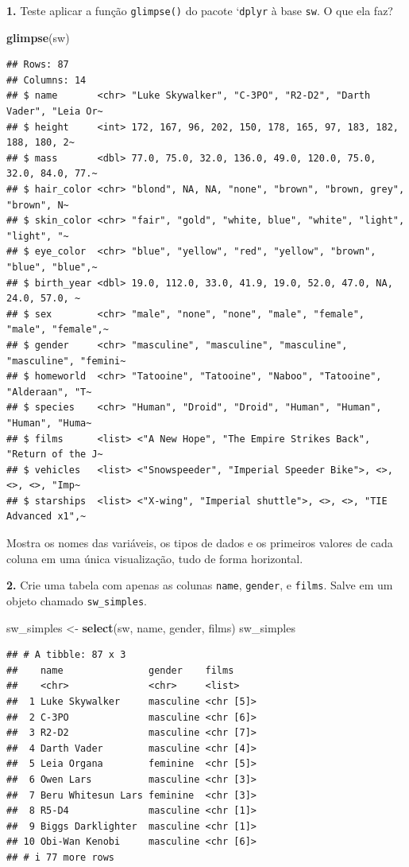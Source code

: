 \documentclass[
]{book}
\newenvironment{Shaded}{\begin{snugshade}}{\end{snugshade}}
\newcommand{\FunctionTok}[1]{\textcolor[rgb]{0.13,0.29,0.53}{\textbf{#1}}}
\newcommand{\NormalTok}[1]{#1}
\newcommand{\OtherTok}[1]{\textcolor[rgb]{0.56,0.35,0.01}{#1}}
\begin{document}
\textbf{1.} Teste aplicar a função \texttt{glimpse()} do pacote `\texttt{dplyr} à base
\texttt{sw}. O que ela faz?

\begin{Shaded}
\begin{Highlighting}[]
\FunctionTok{glimpse}\NormalTok{(sw)}
\end{Highlighting}
\end{Shaded}

\begin{verbatim}
## Rows: 87
## Columns: 14
## $ name       <chr> "Luke Skywalker", "C-3PO", "R2-D2", "Darth Vader", "Leia Or~
## $ height     <int> 172, 167, 96, 202, 150, 178, 165, 97, 183, 182, 188, 180, 2~
## $ mass       <dbl> 77.0, 75.0, 32.0, 136.0, 49.0, 120.0, 75.0, 32.0, 84.0, 77.~
## $ hair_color <chr> "blond", NA, NA, "none", "brown", "brown, grey", "brown", N~
## $ skin_color <chr> "fair", "gold", "white, blue", "white", "light", "light", "~
## $ eye_color  <chr> "blue", "yellow", "red", "yellow", "brown", "blue", "blue",~
## $ birth_year <dbl> 19.0, 112.0, 33.0, 41.9, 19.0, 52.0, 47.0, NA, 24.0, 57.0, ~
## $ sex        <chr> "male", "none", "none", "male", "female", "male", "female",~
## $ gender     <chr> "masculine", "masculine", "masculine", "masculine", "femini~
## $ homeworld  <chr> "Tatooine", "Tatooine", "Naboo", "Tatooine", "Alderaan", "T~
## $ species    <chr> "Human", "Droid", "Droid", "Human", "Human", "Human", "Huma~
## $ films      <list> <"A New Hope", "The Empire Strikes Back", "Return of the J~
## $ vehicles   <list> <"Snowspeeder", "Imperial Speeder Bike">, <>, <>, <>, "Imp~
## $ starships  <list> <"X-wing", "Imperial shuttle">, <>, <>, "TIE Advanced x1",~
\end{verbatim}

Mostra os nomes das variáveis, os tipos de dados e os primeiros valores
de cada coluna em uma única visualização, tudo de forma horizontal.

\textbf{2.} Crie uma tabela com apenas as colunas \texttt{name}, \texttt{gender}, e
\texttt{films}. Salve em um objeto chamado \texttt{sw\_simples}.

\begin{Shaded}
\begin{Highlighting}[]
\NormalTok{sw\_simples }\OtherTok{\textless{}{-}} \FunctionTok{select}\NormalTok{(sw, name, gender, films)}
\NormalTok{sw\_simples}
\end{Highlighting}
\end{Shaded}

\begin{verbatim}
## # A tibble: 87 x 3
##    name               gender    films    
##    <chr>              <chr>     <list>   
##  1 Luke Skywalker     masculine <chr [5]>
##  2 C-3PO              masculine <chr [6]>
##  3 R2-D2              masculine <chr [7]>
##  4 Darth Vader        masculine <chr [4]>
##  5 Leia Organa        feminine  <chr [5]>
##  6 Owen Lars          masculine <chr [3]>
##  7 Beru Whitesun Lars feminine  <chr [3]>
##  8 R5-D4              masculine <chr [1]>
##  9 Biggs Darklighter  masculine <chr [1]>
## 10 Obi-Wan Kenobi     masculine <chr [6]>
## # i 77 more rows
\end{verbatim}
\end{document}
